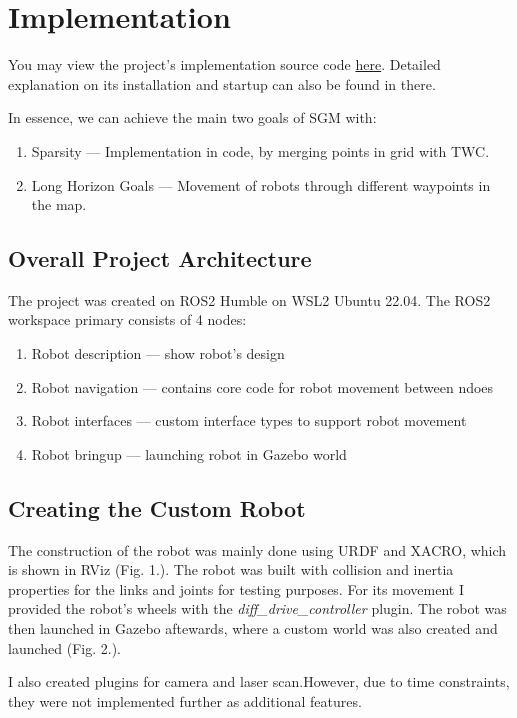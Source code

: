 \documentclass[conference]{IEEEtran}
\begin{document}
\section{Implementation}
You may view the project's implementation source code \href{https://github.com/demeritbird/Sparse-Graphical-Memory-Robot-Planning}{here}. Detailed explanation on its installation and startup can also be found in there.

In essence, we can achieve the main two goals of SGM with:
\begin{enumerate}
  \item Sparsity --- Implementation in code, by merging points in grid with TWC.
  \item Long Horizon Goals --- Movement of robots through different waypoints in the map.
\end{enumerate}

\subsection{Overall Project Architecture}
The project was created on ROS2 Humble on WSL2 Ubuntu 22.04.
The ROS2 workspace primary consists of 4 nodes:
\begin{enumerate}
  \item Robot description --- show robot's design
  \item Robot navigation --- contains core code for robot movement between ndoes
  \item Robot interfaces --- custom interface types to support robot movement
  \item Robot bringup --- launching robot in Gazebo world
\end{enumerate}

\subsection{Creating the Custom Robot}
The construction of the robot was mainly done using URDF and XACRO, which is shown in RViz (Fig. 1.). The robot was built with collision and inertia properties for the links and joints for testing purposes. For its movement I provided the robot's wheels with the \textit{diff\_drive\_controller} plugin. The robot was then launched in Gazebo aftewards, where a custom world was also created and launched (Fig. 2.).

I also created plugins for camera and laser scan.However, due to time constraints, they were not implemented further as additional features.
\end{document}
